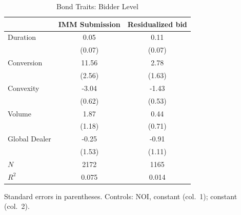 \begin{table}[htbp]
\centering
\caption{Bond Traits: Bidder Level}
\label{tab:os4}
\begin{tabular}{lcc}
\hline\hline
 & IMM Submission & Residualized bid \\
\hline
Duration & 0.05 & 0.11 \\
 & (0.07) & (0.07) \\
Conversion & 11.56 & 2.78 \\
 & (2.56) & (1.63) \\
Convexity & -3.04 & -1.43 \\
 & (0.62) & (0.53) \\
Volume & 1.87 & 0.44 \\
 & (1.18) & (0.71) \\
Global Dealer & -0.25 & -0.91 \\
 & (1.53) & (1.11) \\
\hline
$N$ & 2172 & 1165 \\
$R^2$ & 0.075 & 0.014 \\
\hline\hline
\end{tabular}
\begin{tablenotes}\small\item Standard errors in parentheses. Controls: NOI, constant (col.\ 1); constant (col.\ 2).\end{tablenotes}
\end{table}
